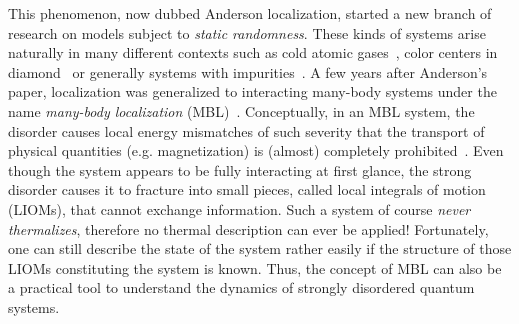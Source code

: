 This phenomenon, now dubbed Anderson localization, started a new branch of research on models subject to \emph{static randomness}. These kinds of systems arise naturally in many different contexts such as cold atomic gases~\cite{schreiberObservationManybodyLocalization2015,kondovDisorderInducedLocalizationStrongly2015}, color centers in diamond~\cite{kucskoCriticalThermalizationDisordered2018,martinControllingLocalThermalization2023} or generally systems with impurities~\cite{weiExploringLocalizationNuclear2018,silevitchTuningHighQNonlinear2019}. A few years after Anderson's paper, localization was generalized to interacting many-body systems under the name \emph{many-body localization} (MBL)~\cite{fleishmanInteractionsAndersonTransition1980,baskoMetalinsulatorTransitionWeakly2006,gornyiInteractingElectronsDisordered2005,bauerAreaLawsManybody2013}. Conceptually, in an MBL system, the disorder causes local energy mismatches of such severity that the transport of physical quantities (e.g. magnetization) is (almost) completely prohibited~\cite{serbynLocalConservationLaws2013,husePhenomenologyFullyManybodylocalized2014,imbrieReviewLocalIntegrals2017}. Even though the system appears to be fully interacting at first glance, the strong disorder causes it to fracture into small pieces, called local integrals of motion (LIOMs), that cannot exchange information. Such a system of course \emph{never thermalizes}, therefore no thermal description can ever be applied! Fortunately, one can still describe the state of the system rather easily if the structure of those LIOMs constituting the system is known. Thus, the concept of MBL can also be a practical tool to understand the dynamics of strongly disordered quantum systems.

